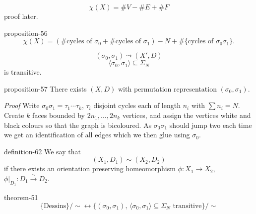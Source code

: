 \documentclass[10pt,]{book}
\makeatletter
\renewcommand*{\proofname}{Proof}
\renewenvironment{proof}[1][\proofname]{\par
  \pushQED{\qed}%
  \normalfont \topsep6\p@\@plus6\p@\relax
  \trivlist
  \item\relax
    {\itshape
    #1\@addpunct{.}}\hspace\labelsep\ignorespaces
}{%
  \popQED\endtrivlist\@endpefalse
}
\numberwithin{equation}{section}
\makeatother
\begin{document}
\begin{equation*}
\chi (X) = \#V -  \#E  + \#F
\end{equation*}
proof later.%
\begin{proposition}{}{}{proposition-56}%
\hypertarget{p-647}{}%
%
\begin{equation*}
\chi(X) = (\#\text{cycles of }\sigma_0+\#\text{cycles of }\sigma_1) - N + \#\{\text{cycles of }\sigma_0\sigma_1\}\text{.}
\end{equation*}
%
\end{proposition}
\hypertarget{p-648}{}%
%
\begin{equation*}
(\sigma_0, \sigma_1) \leadsto (X',D)
\end{equation*}
%
\begin{equation*}
\langle \sigma_0, \sigma_1 \rangle \subseteq \Sigma_N
\end{equation*}
is transitive.%
\begin{proposition}{}{}{proposition-57}%
\hypertarget{p-649}{}%
There exists \((X,D)\) with permutation representation \((\sigma_0, \sigma_1)\).%
\end{proposition}
\begin{proof}\hypertarget{proof-97}{}
\hypertarget{p-650}{}%
Write \(\sigma_0\sigma_1 = \tau_1 \cdots \tau_k\), \(\tau_i\) disjoint cycles each of length \(n_i\) with \(\sum n_i = N\). Create \(k\) faces bounded by \(2n_1, \ldots, 2n_k\) vertices, and assign the vertices white and black colours so that the graph is bicoloured. As \(\sigma_0\sigma_1\) should jump two each time we get an identification of all edges which we then  glue using \(\sigma_0\).%
\end{proof}
\begin{definition}{}{definition-62}%
\hypertarget{p-651}{}%
We say that%
\begin{equation*}
(X_1, D_1) \sim (X_2, D_2)
\end{equation*}
if there exists an orientation preserving homeomorphism \(\phi \colon X_1 \to X_2\), \(\phi|_{D_1} \colon D_1 \xrightarrow\sim D_2\).%
\end{definition}
\begin{theorem}{}{}{theorem-51}%
\hypertarget{p-652}{}%
%
\begin{equation*}
\{\text{Dessins}\}/\sim \leftrightarrow \{( \sigma_0, \sigma_1),\,\langle \sigma_0, \sigma_1 \rangle \subseteq \Sigma_N \text{ transitive}\}/\sim
\end{equation*}
%
\end{theorem}
%
%
\typeout{************************************************}
\typeout{************************************************}
%
\end{document}
